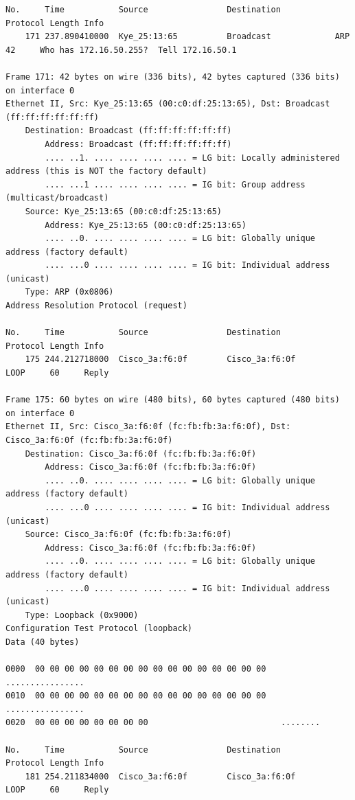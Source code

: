 \documentclass[a4paper,11pt]{article}
\begin{document}
\begin{lstlisting}
No.     Time           Source                Destination           Protocol Length Info
    171 237.890410000  Kye_25:13:65          Broadcast             ARP      42     Who has 172.16.50.255?  Tell 172.16.50.1

Frame 171: 42 bytes on wire (336 bits), 42 bytes captured (336 bits) on interface 0
Ethernet II, Src: Kye_25:13:65 (00:c0:df:25:13:65), Dst: Broadcast (ff:ff:ff:ff:ff:ff)
    Destination: Broadcast (ff:ff:ff:ff:ff:ff)
        Address: Broadcast (ff:ff:ff:ff:ff:ff)
        .... ..1. .... .... .... .... = LG bit: Locally administered address (this is NOT the factory default)
        .... ...1 .... .... .... .... = IG bit: Group address (multicast/broadcast)
    Source: Kye_25:13:65 (00:c0:df:25:13:65)
        Address: Kye_25:13:65 (00:c0:df:25:13:65)
        .... ..0. .... .... .... .... = LG bit: Globally unique address (factory default)
        .... ...0 .... .... .... .... = IG bit: Individual address (unicast)
    Type: ARP (0x0806)
Address Resolution Protocol (request)

No.     Time           Source                Destination           Protocol Length Info
    175 244.212718000  Cisco_3a:f6:0f        Cisco_3a:f6:0f        LOOP     60     Reply

Frame 175: 60 bytes on wire (480 bits), 60 bytes captured (480 bits) on interface 0
Ethernet II, Src: Cisco_3a:f6:0f (fc:fb:fb:3a:f6:0f), Dst: Cisco_3a:f6:0f (fc:fb:fb:3a:f6:0f)
    Destination: Cisco_3a:f6:0f (fc:fb:fb:3a:f6:0f)
        Address: Cisco_3a:f6:0f (fc:fb:fb:3a:f6:0f)
        .... ..0. .... .... .... .... = LG bit: Globally unique address (factory default)
        .... ...0 .... .... .... .... = IG bit: Individual address (unicast)
    Source: Cisco_3a:f6:0f (fc:fb:fb:3a:f6:0f)
        Address: Cisco_3a:f6:0f (fc:fb:fb:3a:f6:0f)
        .... ..0. .... .... .... .... = LG bit: Globally unique address (factory default)
        .... ...0 .... .... .... .... = IG bit: Individual address (unicast)
    Type: Loopback (0x9000)
Configuration Test Protocol (loopback)
Data (40 bytes)

0000  00 00 00 00 00 00 00 00 00 00 00 00 00 00 00 00   ................
0010  00 00 00 00 00 00 00 00 00 00 00 00 00 00 00 00   ................
0020  00 00 00 00 00 00 00 00                           ........

No.     Time           Source                Destination           Protocol Length Info
    181 254.211834000  Cisco_3a:f6:0f        Cisco_3a:f6:0f        LOOP     60     Reply


\end{lstlisting}
\end{document}
